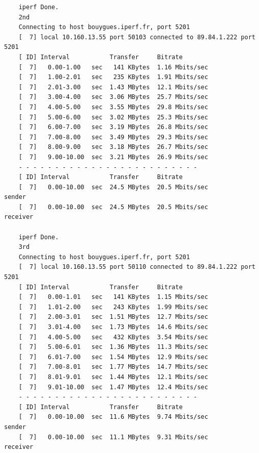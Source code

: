 \documentclass[paper=a4, fontsize=10pt]{scrartcl} %
\numberwithin{equation}{section} %
\numberwithin{figure}{section} %
\numberwithin{table}{section} %
\begin{document}
\begin{lstlisting}
    iperf Done.
    2nd
    Connecting to host bouygues.iperf.fr, port 5201
    [  7] local 10.160.13.55 port 50103 connected to 89.84.1.222 port 5201
    [ ID] Interval           Transfer     Bitrate
    [  7]   0.00-1.00   sec   141 KBytes  1.16 Mbits/sec                  
    [  7]   1.00-2.01   sec   235 KBytes  1.91 Mbits/sec                  
    [  7]   2.01-3.00   sec  1.43 MBytes  12.1 Mbits/sec                  
    [  7]   3.00-4.00   sec  3.06 MBytes  25.7 Mbits/sec                  
    [  7]   4.00-5.00   sec  3.55 MBytes  29.8 Mbits/sec                  
    [  7]   5.00-6.00   sec  3.02 MBytes  25.3 Mbits/sec                  
    [  7]   6.00-7.00   sec  3.19 MBytes  26.8 Mbits/sec                  
    [  7]   7.00-8.00   sec  3.49 MBytes  29.3 Mbits/sec                  
    [  7]   8.00-9.00   sec  3.18 MBytes  26.7 Mbits/sec                  
    [  7]   9.00-10.00  sec  3.21 MBytes  26.9 Mbits/sec                  
    - - - - - - - - - - - - - - - - - - - - - - - - -
    [ ID] Interval           Transfer     Bitrate
    [  7]   0.00-10.00  sec  24.5 MBytes  20.5 Mbits/sec                  sender
    [  7]   0.00-10.00  sec  24.5 MBytes  20.5 Mbits/sec                  receiver
    
    iperf Done.
    3rd
    Connecting to host bouygues.iperf.fr, port 5201
    [  7] local 10.160.13.55 port 50110 connected to 89.84.1.222 port 5201
    [ ID] Interval           Transfer     Bitrate
    [  7]   0.00-1.01   sec   141 KBytes  1.15 Mbits/sec                  
    [  7]   1.01-2.00   sec   243 KBytes  1.99 Mbits/sec                  
    [  7]   2.00-3.01   sec  1.51 MBytes  12.7 Mbits/sec                  
    [  7]   3.01-4.00   sec  1.73 MBytes  14.6 Mbits/sec                  
    [  7]   4.00-5.00   sec   432 KBytes  3.54 Mbits/sec                  
    [  7]   5.00-6.01   sec  1.36 MBytes  11.3 Mbits/sec                  
    [  7]   6.01-7.00   sec  1.54 MBytes  12.9 Mbits/sec                  
    [  7]   7.00-8.01   sec  1.77 MBytes  14.7 Mbits/sec                  
    [  7]   8.01-9.01   sec  1.44 MBytes  12.1 Mbits/sec                  
    [  7]   9.01-10.00  sec  1.47 MBytes  12.4 Mbits/sec                  
    - - - - - - - - - - - - - - - - - - - - - - - - -
    [ ID] Interval           Transfer     Bitrate
    [  7]   0.00-10.00  sec  11.6 MBytes  9.74 Mbits/sec                  sender
    [  7]   0.00-10.00  sec  11.1 MBytes  9.31 Mbits/sec                  receiver
    

\end{lstlisting}
\end{document}
